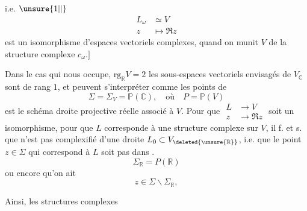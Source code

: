 i.e. \(\unsure{1|\vert}\)
\[
 \begin{aligned} L_\omega&\simeq V\\ z&\longmapsto\Re z\end{aligned}
\]
est un isomorphisme d'espaces vectoriels complexes, quand on munit $V$ de la structure complexe $c_\omega$.\(\big]\)

Dans le cas qui nous occupe, $\mathrm{rg}_{\mathbb R}V=2$ les  sous-espaces vectoriels envisagés de $V_{\mathbb C}$ sont de  rang $1$,  et peuvent s'interpréter comme les points de
\[
 \Sigma=\Sigma_V=\mathbb P(\mathbb C),\quad\text{où}\quad P=\mathbb P(V) \tag*{(16)}
\]
est le  schéma droite projective réelle associé à $V$. Pour que $\begin{aligned}L&\longrightarrow V\\ z&\longrightarrow\Re z\end{aligned}$ soit un isomorphisme,  pour que $L$ corresponde à une structure complexe  sur $V$, il f. et s. que   n'est pas complexifié d'une  droite $L_0\subset V_{\deleted{\unsure{\mathbb R}}}$, i.e. que le point $z\in\Sigma$ qui correspond à $L$  soit pas dans .
\[
 \Sigma_{\mathbb R}=P(\mathbb R)
\]
ou encore qu'on ait
\[
 z\in\Sigma\smallsetminus\Sigma_{\mathbb R}, \tag*{(17)}
\]

 Ainsi, les structures complexes
